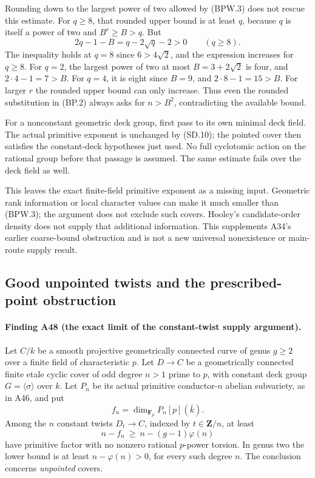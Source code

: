 \documentclass[11pt,a4paper]{article}
\begin{document}
Rounding down to the largest power of two allowed by (BPW.3)
does not rescue this estimate. For $q\ge8$, that rounded
upper bound is at least $q$, because $q$ is itself a power
of two and $B^r\ge B>q$. But
\[
           2q-1-B=q-2\sqrt q-2>0\qquad(q\ge8).
 \tag{BPW.4}
\]
The inequality holds at $q=8$ since $6>4\sqrt2$, and the
expression increases for $q\ge8$. For $q=2$, the largest
power of two at most $B=3+2\sqrt2$ is four, and
$2\cdot4-1=7>B$. For $q=4$, it is eight since $B=9$,
and $2\cdot8-1=15>B$.
For larger $r$ the rounded upper bound can only increase.
Thus even the rounded substitution in (BP.2) always asks for
$n>B^2$, contradicting the available bound.

For a nonconstant geometric deck group, first pass to its own
minimal deck field. The actual primitive exponent is unchanged
by (SD.10); the pointed cover then satisfies the constant-deck
hypotheses just used. No full cyclotomic action on the rational
group before that passage is assumed. The same estimate fails
over the deck field as well.

This leaves the exact finite-field primitive exponent as a
missing input. Geometric rank information or local character
values can make it much smaller than (BPW.3); the argument
does not exclude such covers. Hooley's candidate-order density
does not supply that additional information. This supplements
A34's earlier coarse-bound obstruction and is not a new
universal nonexistence or main-route supply result.


\subsection{Good unpointed twists and the prescribed-point obstruction}
\label{sec:twists-pointing-obstruction}

\paragraph{Finding A48 (the exact limit of the constant-twist supply argument).}
Let $C/k$ be a smooth projective geometrically connected curve of
genus $g\ge2$ over a finite field of characteristic $p$.
Let $D\to C$ be a geometrically connected finite etale cyclic
cover of odd degree $n>1$ prime to $p$, with constant deck group
$G=\langle\sigma\rangle$ over $k$. Let $P_n$ be its actual
primitive conductor-$n$ abelian subvariety, as in A46, and put
\[
                       f_n=\dim_{\mathbf F_p}P_n[p](\bar k).
\]
Among the $n$ constant twists $D_t\to C$, indexed by
$t\in\mathbf Z/n$, at least
\[
                n-f_n\ \ge\ n-(g-1)\varphi(n)
 \tag{TW.1}
\]
have primitive factor with no nonzero rational $p$-power
torsion. In genus two the lower bound is at least
$n-\varphi(n)>0$, for every such degree $n$.
The conclusion concerns \emph{unpointed} covers.
\end{document}
